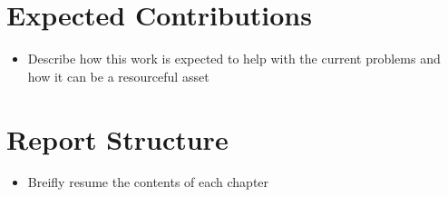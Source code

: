 \section{Expected Contributions}
\label{sub:expected_Contributions}

\begin{itemize}
    \item Describe how this work is expected to help with the current problems
    and how it can be a resourceful asset
\end{itemize}

\section{Report Structure}
\label{sec:report_structure}

\begin{itemize}
    \item Breifly resume the contents of each chapter
\end{itemize}